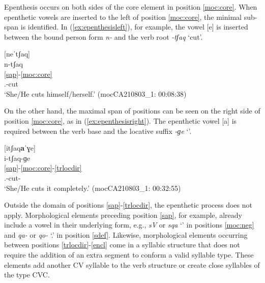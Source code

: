 \documentclass[output=paper]{langscibook}
\begin{document}
 Epenthesis occurs on both sides of the core element in position \ref{moc:core}. When epenthetic vowels are inserted to the left of position \ref{moc:core}, the minimal sub-span is identified. In  (\ref{ex:epenthesisleft}), for example, the vowel [e] is inserted between the bound person form \textit{n-} and the verb root \textit{-tʃaq} `cut'. 

\ea\label{ex:epenthesisleft}
 [neˈtʃaq]\\
\glll n-tʃaq\\
\ref{sap}-\ref{moc:core}\\
{\Third.\III}-cut\\
\glt `She/He cuts himself/herself.' \hfill(mocCA210803\_1: 00:08:38)
\z

On the other hand, the maximal span of positions can be seen on the right side of position \ref{moc:core}, as in (\ref{ex:epenthesisright}). The epenthetic vowel [a] is required between the verb base and the locative suffix \textit{-ɡe} `{\LocTwo}'. 

\ea\label{ex:epenthesisright}
 [itʃaq\textbf{a}ˈɣe]\\
\glll i-tʃaq-ɡe\\
\ref{sap}-\ref{moc:core}-\ref{trlocdir}\\
{\Third.\III}-cut-{\LocTwo}\\
\glt `She/He cuts it completely.' \hfill(mocCA210803\_1: 00:32:55)
\z 

Outside the domain of positions \ref{sap}-\ref{trlocdir}, the epenthetic process does not apply. Morphological elements preceding position \ref{sap}, for example, already include a vowel in their underlying form, e.g., \textit{sV} or \textit{sqa} `\Neg' in positions \ref{moc:neg} and \textit{qa-} or \textit{qo-} `\Def.\Sbj' in position \ref{sdef}. Likewise, morphological elements occurring between positions \ref{trlocdir}-\ref{encl} come in a syllabic structure that does not require the addition of an extra segment to conform a valid syllable type. These elements add another CV syllable to the verb structure or create close syllables of the type CVC. 

\end{document}
